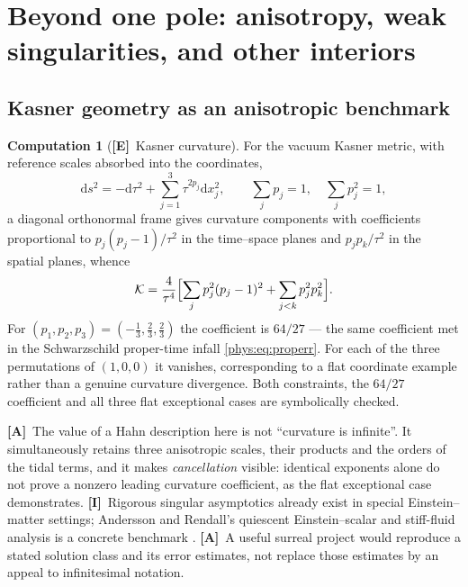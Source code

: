 \documentclass[11pt,letterpaper]{article}
\numberwithin{equation}{section}
\theoremstyle{definition}
\newtheorem{computation}[theorem]{Computation}
\theoremstyle{remark}
\newcommand{\Kret}{\mathcal K}
\newcommand{\dd}{\mathrm d}
\newcommand{\TE}{\textcolor{TierE}{\textsf{\bfseries[E]}}}
\newcommand{\TA}{\textcolor{TierA}{\textsf{\bfseries[A]}}}
\newcommand{\TI}{\textcolor{TierI}{\textsf{\bfseries[I]}}}
\begin{document}
\section{Beyond one pole: anisotropy, weak singularities, and other interiors}
\label{phys:sec:beyond}

\subsection{Kasner geometry as an anisotropic benchmark}
\label{phys:sub:kasner}

\begin{computation}[\TE\ Kasner curvature]
\label{phys:comp:kasner}
For the vacuum Kasner metric, with reference scales absorbed into the
coordinates,
\begin{equation}\label{phys:eq:kasner}
\dd s^{2}=-\dd\tau^{2}+\sum_{j=1}^{3}\tau^{2p_{j}}\dd x_{j}^{2},
\qquad \sum_{j}p_{j}=1,\quad\sum_{j}p_{j}^{2}=1,
\end{equation}
a diagonal orthonormal frame gives curvature components with coefficients
proportional to $p_{j}(p_{j}-1)/\tau^{2}$ in the time--space planes and
$p_{j}p_{k}/\tau^{2}$ in the spatial planes, whence
\begin{equation}\label{phys:eq:kasnerK}
\Kret=\frac{4}{\tau^{4}}
\Bigl[\sum_{j}p_{j}^{2}(p_{j}-1)^{2}
+\sum_{j<k}p_{j}^{2}p_{k}^{2}\Bigr].
\end{equation}
For $(p_{1},p_{2},p_{3})=(-\tfrac13,\tfrac23,\tfrac23)$ the coefficient is
$64/27$ --- the same coefficient met in the Schwarzschild proper-time infall
\eqref{phys:eq:properr}. For each of the three permutations of $(1,0,0)$ it
vanishes, corresponding to a flat coordinate example rather than a genuine
curvature divergence. Both constraints, the $64/27$ coefficient and all three
flat exceptional cases are symbolically checked.
\end{computation}

\TA\ The value of a Hahn description here is not ``curvature is infinite''. It
simultaneously retains three anisotropic scales, their products and the orders
of the tidal terms, and it makes \emph{cancellation} visible: identical
exponents alone do not prove a nonzero leading curvature coefficient, as the
flat exceptional case demonstrates. \TI\ Rigorous singular asymptotics already
exist in special Einstein--matter settings; Andersson and Rendall's quiescent
Einstein--scalar and stiff-fluid analysis is a concrete benchmark
\cite{phys:AR}. \TA\ A useful surreal project would reproduce a stated solution
class and its error estimates, not replace those estimates by an appeal to
infinitesimal notation.
\end{document}
